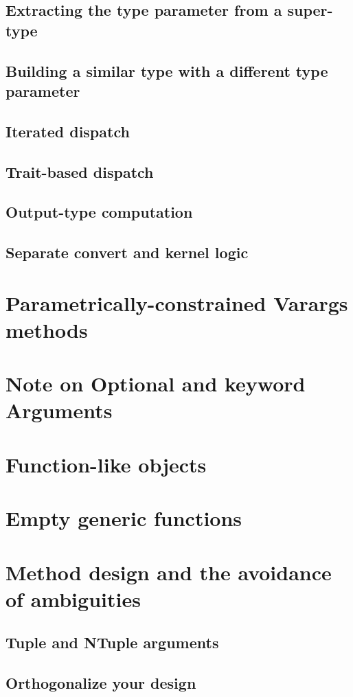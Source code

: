     \subsection{Extracting the type parameter from a super-type}
    \subsection{Building a similar type with a different type parameter}
    \subsection{Iterated dispatch}
    \subsection{Trait-based dispatch}
    \subsection{Output-type computation}
    \subsection{Separate convert and kernel logic}
    \section{Parametrically-constrained Varargs methods}
    \section{Note on Optional and keyword Arguments}
    \section{Function-like objects}
    \section{Empty generic functions}
    \section{Method design and the avoidance of ambiguities}
    \subsection{Tuple and NTuple arguments}
    \subsection{Orthogonalize your design}
